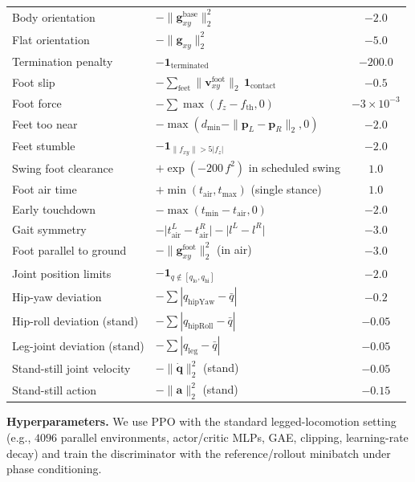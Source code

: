 \documentclass[conference]{IEEEtran}
\begin{document}
\begin{table}[t]
\begin{tabular}{llc}
    Body orientation & $-\|\mathbf{g}_{xy}^{\mathrm{base}}\|_2^2$ & $-2.0$ \\
    Flat orientation & $-\|\mathbf{g}_{xy}\|_2^2$ & $-5.0$ \\
    Termination penalty & $-\mathbf{1}_{\mathrm{terminated}}$ & $-200.0$ \\
    Foot slip & $-\sum_{\mathrm{feet}}\|\mathbf{v}_{xy}^{\mathrm{foot}}\|_2\,\mathbf{1}_{\mathrm{contact}}$ & $-0.5$ \\
    Foot force & $-\sum\max(f_z-f_{\mathrm{th}},0)$ & $-3\times10^{-3}$ \\
    Feet too near & $-\max(d_{\mathrm{min}}-\|\mathbf{p}_L-\mathbf{p}_R\|_2,0)$ & $-2.0$ \\
    Feet stumble & $-\mathbf{1}_{\|f_{xy}\|>5|f_z|}$ & $-2.0$ \\
    Swing foot clearance & $+\exp(-200\,f^2)$ in scheduled swing & $1.0$ \\
    Foot air time & $+\min(t_{\mathrm{air}},t_{\mathrm{max}})$ (single stance) & $1.0$ \\
    Early touchdown & $-\max(t_{\mathrm{min}}-t_{\mathrm{air}},0)$ & $-2.0$ \\
    Gait symmetry & $-\big|t_{\mathrm{air}}^L-t_{\mathrm{air}}^R\big|-\big|l^L-l^R\big|$ & $-3.0$ \\
    Foot parallel to ground & $-\|\mathbf{g}_{xy}^{\mathrm{foot}}\|_2^2$ (in air) & $-3.0$ \\
    Joint position limits & $-\mathbf{1}_{q\notin[q_{\mathrm{lo}},q_{\mathrm{hi}}]}$ & $-2.0$ \\
    Hip-yaw deviation & $-\sum|q_{\mathrm{hipYaw}}-\bar q|$ & $-0.2$ \\
    Hip-roll deviation (stand) & $-\sum|q_{\mathrm{hipRoll}}-\bar q|$ & $-0.05$ \\
    Leg-joint deviation (stand) & $-\sum|q_{\mathrm{leg}}-\bar q|$ & $-0.05$ \\
    Stand-still joint velocity & $-\|\dot{\mathbf{q}}\|_2^2$ (stand) & $-0.05$ \\
    Stand-still action & $-\|\mathbf{a}\|_2^2$ (stand) & $-0.15$ \\
    \bottomrule
  \end{tabular}
\end{table}

\noindent\textbf{Hyperparameters.}
We use PPO with the standard legged-locomotion setting (e.g., $4096$ parallel environments, actor/critic MLPs, GAE, clipping, learning-rate decay) and train the discriminator with the reference/rollout minibatch under phase conditioning.
\end{document}
